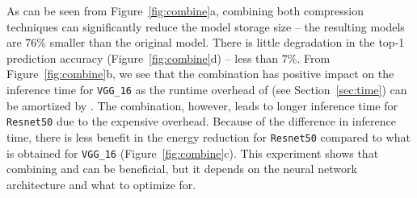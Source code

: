 As can be seen from Figure~\ref{fig:combine}a, combining both compression techniques can significantly reduce the model storage size -- the
resulting models are 76\% smaller than the original model. There is little degradation in the top-1 prediction accuracy
(Figure~\ref{fig:combine}d) -- less than 7\%. From Figure~\ref{fig:combine}b, we see that the combination has positive impact on the
inference time for \texttt{VGG\_16} as the runtime overhead of \dquantization (see Section~\ref{sec:time}) can be amortized by \pruning.
The combination, however, leads to longer inference time for \texttt{Resnet50} due to the expensive \dquantization overhead. Because of the
difference in inference time, there is less benefit in the energy reduction for \texttt{Resnet50} compared to what is obtained for
\texttt{VGG\_16} (Figure~\ref{fig:combine}c). This experiment shows that combining \pruning and \quantization can be beneficial, but it
depends on the neural network architecture and what to optimize for.

